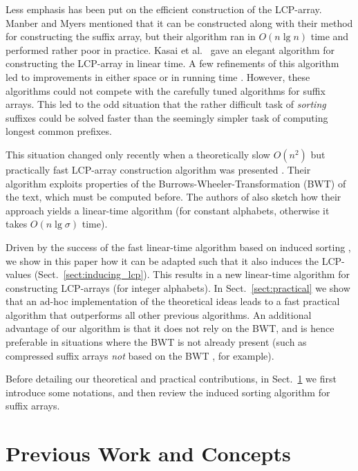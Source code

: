 \documentclass[11pt,onecolumn,final]{article} \usepackage[latin1]{inputenc}
\theoremstyle{plain}
\theoremstyle{remark}
\begin{document}
Less emphasis has been put on the efficient construction of the LCP-array. Manber and Myers \cite{manber93suffix} mentioned that it can be constructed along with their method for constructing the suffix array, but their algorithm ran in $O(n\lg n)$ time and performed rather poor in practice. Kasai et al.~\cite{kasai01linear} gave an elegant algorithm for constructing the LCP-array in linear time. A few refinements of this algorithm led to improvements in either space \cite{manzini04two} or in running time \cite{kaerkkaeinen09permuted}. However, these algorithms could not compete with the carefully tuned algorithms for suffix arrays. This led to the odd situation that the rather difficult task of \emph{sorting} suffixes could be solved faster than the seemingly simpler task of computing longest common prefixes.

This situation changed only recently when a theoretically slow $O(n^2)$ but practically fast LCP-array construction algorithm was presented \cite{gog11fast}. Their algorithm exploits properties of the Burrows-Wheeler-Transformation (BWT) of the text, which must be computed before. The authors of \cite{gog11fast} also sketch how their approach yields a linear-time algorithm (for constant alphabets, otherwise it takes $O(n\lg\sigma)$ time).

Driven by the success of the fast linear-time algorithm based on induced sorting \cite{nong09linear}, we show in this paper how it can be adapted such that it also induces the LCP-values (Sect.~\ref{sect:inducing_lcp}). This results in a new linear-time algorithm for constructing LCP-arrays (for integer alphabets). In Sect.~\ref{sect:practical} we show that an ad-hoc implementation of the theoretical ideas leads to a fast practical algorithm that outperforms all other previous algorithms. An additional advantage of our algorithm is that it does not rely on the BWT, and is hence preferable in situations where the BWT is not already present (such as compressed suffix arrays \emph{not} based on the BWT \cite{navarro07compressed}, for example).

Before detailing our theoretical and practical contributions, in Sect.~\ref{sect:preliminaries} we first introduce some notations, and then review the induced sorting algorithm for suffix arrays.


\section{Previous Work and Concepts}
\label{sect:preliminaries}
\end{document}
